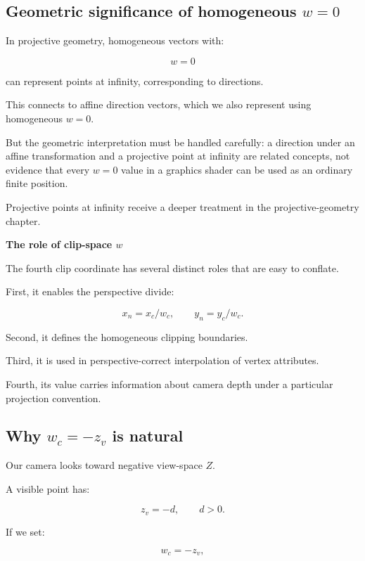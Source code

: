 \subsection{\texorpdfstring{Geometric significance of homogeneous \(w=0\)}{Geometric significance of homogeneous w=0}}\label{02-foundations-ii-ch033-geometric-significance-of-homogeneous-w0}

In projective geometry, homogeneous vectors with:

\[
 w=0
\]

can represent points at infinity, corresponding to directions.

This connects to affine direction vectors, which we also represent using homogeneous \(w=0\).

But the geometric interpretation must be handled carefully: a direction under an affine transformation and a projective point at infinity are related concepts, not evidence that every \(w=0\) value in a graphics shader can be used as an ordinary finite position.

Projective points at infinity receive a deeper treatment in the projective-geometry chapter.

\textbf{The role of clip-space \(w\)}

The fourth clip coordinate has several distinct roles that are easy to conflate.

First, it enables the perspective divide:

\[
 x_n=x_c/w_c, \qquad y_n=y_c/w_c.
\]

Second, it defines the homogeneous clipping boundaries.

Third, it is used in perspective-correct interpolation of vertex attributes.

Fourth, its value carries information about camera depth under a particular projection convention.

\subsection{\texorpdfstring{Why \(w_c=-z_v\) is natural}{Why w\_c=-z\_v is natural}}\label{02-foundations-ii-ch033-why-w_c-z_v-is-natural}

Our camera looks toward negative view-space \(Z\).

A visible point has:

\[
 z_v=-d, \qquad d>0.
\]

If we set:

\[
 w_c=-z_v,
\]


